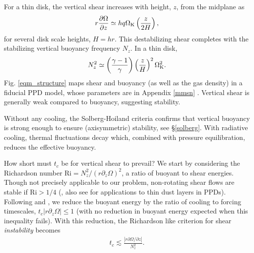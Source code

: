 \documentclass[iop]{emulateapj}
\newcommand{\p}{\partial}
\def \OmK {\Omega_{\rm K}}
\begin{document}
For a thin disk, the vertical shear increases with height, $z$, from the midplane as 
\begin{align}\label{vshear_thin}
  r \frac{\p \Omega }{\p z} \simeq  h q \OmK \left(\frac{z}{2 H}\right),
\end{align}
for several disk scale heights, $H = hr$. 
%
This destabilizing shear completes with the stabilizing vertical
buoyancy frequency $N_z$.  In a thin disk,     
\begin{align}\label{nz_thin}
  N_z^2 \simeq \left(\frac{\gamma-1}{\gamma}\right) \left(\frac{z}{H}\right)^2
  \OmK^2.  
\end{align}
Fig. \ref{eqm_structure} maps shear and buoyancy (as well as the gas density) 
in a fiducial PPD model, whose parameters are in Appendix \ref{mmsn} . %
Vertical shear is 
generally weak compared to buoyancy, suggesting stability. 


Without any cooling, the Solberg-Hoiland criteria confirms that vertical buoyancy is strong
enough to ensure (axisymmetric) stability, see \S\ref{solberg}.  With radiative cooling, 
thermal fluctuations decay which, combined with pressure equilibration, reduces the effective buoyancy.


How short must $t_c$ be for vertical shear to prevail?  We start by 
considering the Richardson number $\mathrm{Ri} = N_z^2/(r\p_z\Omega)^2$, a 
ratio of buoyant to shear energies.  Though not precisely applicable to our problem,
non-rotating shear flows are stable if $\mathrm{Ri} > 1/4$ (\citealp{chandrasekhar61}, 
also see \citealp{ys02, lee10} for applications to thin dust layers in PPDs).
Following \cite{urpin03} and \cite{townsend58},  we reduce the buoyant energy by the 
ratio of cooling to forcing timescales, $t_c |r \p_z\Omega| \leq 1$ (with no reduction in buoyant energy 
expected when this inequality fails).  With this reduction, the Richardson like criterion for 
shear \emph{instability} becomes
\begin{align}\label{bcrit_est}
  t_c \lesssim \frac{\left|r\p\Omega/\p z\right|} {N_z^2}. 
\end{align}
\end{document}
